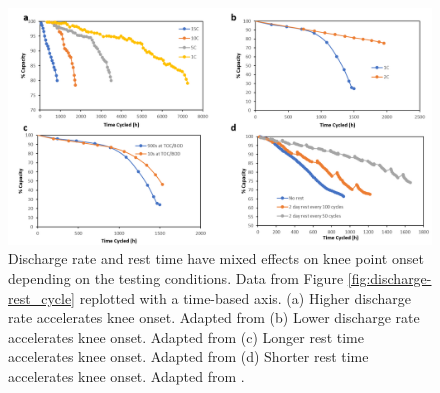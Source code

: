 \documentclass{article}
\begin{document}
\begin{figure}[ht]
\centering
\includegraphics[scale = 0.6]{figures/Discharge-rest_time.png}
\caption{Discharge rate and rest time have mixed effects on knee point onset depending on the testing conditions. Data from Figure \ref{fig:discharge-rest_cycle} replotted with a time-based axis. (a) Higher discharge rate accelerates knee onset. Adapted from \cite{omar_lithium_2014} (b) Lower discharge rate accelerates knee onset. Adapted from \cite{keil_linear_2019} (c) Longer rest time accelerates knee onset. Adapted from \cite{keil_linear_2019} (d) Shorter rest time accelerates knee onset. Adapted from \cite{epding_investigation_2019}.}
\label{fig:discharge-rest_time}
\end{figure}



\end{document}
